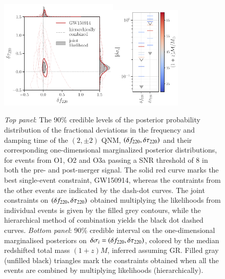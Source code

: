 \begin{figure}
        \includegraphics[width=0.5\textwidth]{figures/rin_pseob_results_v2.pdf}\includegraphics[width=0.3\textwidth]{figures/rin_all_events_bounds.pdf}
        \caption{\emph{Top panel}: The 90\% credible levels of the posterior probability distribution of the fractional deviations in the frequency and damping time of the $(2,\pm 2)$ QNM, $(\delta f_{\text{220}},\delta \tau_{\text{220}})$ and their corresponding one-dimensional marginalized posterior distributions, for events from O1, O2 and O3a passing a SNR threshold of $8$ in both the pre- and post-merger signal. The solid red curve marks the best single-event constraint, GW150914, whereas the contraints from the other events are indicated by the dash-dot curves. The joint constraints on $(\delta f_{\text{220}},\delta \tau_{\text{220}})$ obtained multiplying the likelihoods from individual events is given by the filled grey contours, while the hierarchical method of combination yields the black dot dashed curves. \emph{Bottom panel}: 90\% credible interval on the one-dimensional marginalised posteriors on $\delta \sigma_i=(\delta f_{\text{220}},\delta \tau_{\text{220}})$, colored by the median redshifted total mass $(1 + z)M$, inferred assuming GR. Filled gray (unfilled black) triangles mark the constraints obtained when all the events are combined by multiplying likelihoods (hierarchically).}
        \label{fig:o1o2_events}
\end{figure}


